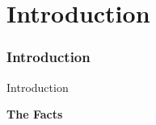 %

\section{Introduction}
\begin{frame}[fragile]
	\frametitle{Introduction}

	\begin{center}\huge{Introduction}\end{center}
	\begin{center}\huge{\color{typo3darkgrey}\textbf{The Facts}}\end{center}

\end{frame}

